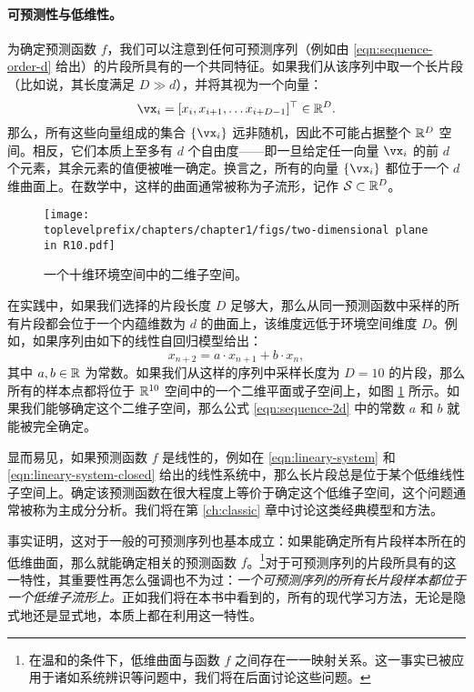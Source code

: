 \documentclass[../../book-main_zh.tex]{subfiles}
\begin{document}
\paragraph{可预测性与低维性。}
为确定预测函数 $f$，我们可以注意到任何可预测序列（例如由 \eqref{eqn:sequence-order-d} 给出）的片段所具有的一个共同特征。如果我们从该序列中取一个长片段（比如说，其长度满足 $D \gg d$），并将其视为一个向量：
\begin{equation}
    \vx_i = [x_i, x_{i+1}, \ldots x_{i+D-1}]^\top \in \mathbb{R}^D.
\end{equation}
那么，所有这些向量组成的集合 $\{\vx_i\}$ 远非随机，因此不可能占据整个 $\mathbb{R}^D$ 空间。相反，它们本质上至多有 $d$ 个自由度——即一旦给定任一向量 $\vx_i$ 的前 $d$ 个元素，其余元素的值便被唯一确定。换言之，所有的向量 $\{\vx_i\}$ 都位于一个 $d$ 维曲面上。在数学中，这样的曲面通常被称为子流形，记作 $\mathcal{S} \subset \mathbb{R}^D$。

\begin{figure}[t]
\centering
\texttt{[image: \\toplevelprefix/chapters/chapter1/figs/two-dimensional plane in R10.pdf]}
    \caption{一个十维环境空间中的二维子空间。}
    \label{fig:lowdimplane}
\end{figure}
在实践中，如果我们选择的片段长度 $D$ 足够大，那么从同一预测函数中采样的所有片段都会位于一个内蕴维数为 $d$ 的曲面上，该维度远低于环境空间维度 $D$。例如，如果序列由如下的线性自回归模型给出：
\begin{equation}
    x_{n+2} = a\cdot x_{n+1} + b\cdot x_n,
    \label{eqn:sequence-2d}
\end{equation}
其中 $a, b \in \mathbb{R}$ 为常数。如果我们从这样的序列中采样长度为 $D =10$ 的片段，那么所有的样本点都将位于 $\mathbb{R}^{10}$ 空间中的一个二维平面或子空间上，如图 \ref{fig:lowdimplane} 所示。如果我们能够确定这个二维子空间，那么公式 \eqref{eqn:sequence-2d} 中的常数 $a$ 和 $b$ 就能被完全确定。

显而易见，如果预测函数 $f$ 是线性的，例如在 \eqref{eqn:lineary-system} 和 \eqref{eqn:lineary-system-closed} 给出的线性系统中，那么长片段总是位于某个低维线性子空间上。确定该预测函数在很大程度上等价于确定这个低维子空间，这个问题通常被称为主成分分析。我们将在第 \ref{ch:classic} 章中讨论这类经典模型和方法。

事实证明，这对于一般的可预测序列也基本成立：如果能确定所有片段样本所在的低维曲面，那么就能确定相关的预测函数 $f$。\footnote{在温和的条件下，低维曲面与函数 $f$ 之间存在一一映射关系。这一事实已被应用于诸如系统辨识等问题中，我们将在后面讨论这些问题。}对于可预测序列的片段所具有的这一特性，其重要性再怎么强调也不为过：{\em 一个可预测序列的所有长片段样本都位于一个低维子流形上。}正如我们将在本书中看到的，所有的现代学习方法，无论是隐式地还是显式地，本质上都在利用这一特性。%
\end{document}
